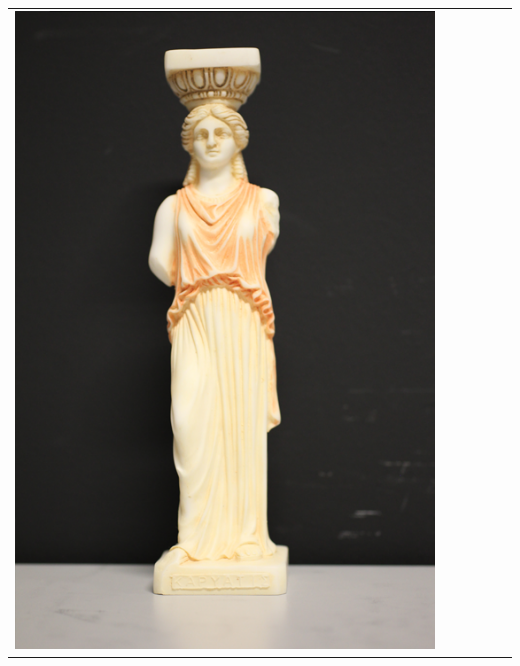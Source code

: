 \documentclass[final,12pt,3p]{elsarticle}
\begin{document}
\begin{table}
{\begin{tabular}{| c |  m{0.8cm} | m{0.8cm} | c | c | c |}
	\includegraphics[scale=0.05]{./kariatida_real.png} & 

\end{tabular}}
\end{table}
\end{document}
